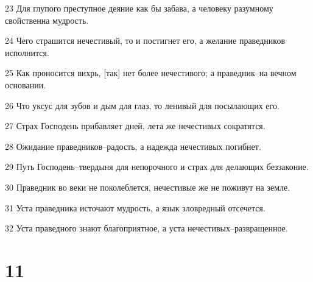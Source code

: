 \par 23 Для глупого преступное деяние как бы забава, а человеку разумному свойственна мудрость.
\par 24 Чего страшится нечестивый, то и постигнет его, а желание праведников исполнится.
\par 25 Как проносится вихрь, [так] нет более нечестивого; а праведник--на вечном основании.
\par 26 Что уксус для зубов и дым для глаз, то ленивый для посылающих его.
\par 27 Страх Господень прибавляет дней, лета же нечестивых сократятся.
\par 28 Ожидание праведников--радость, а надежда нечестивых погибнет.
\par 29 Путь Господень--твердыня для непорочного и страх для делающих беззаконие.
\par 30 Праведник во веки не поколеблется, нечестивые же не поживут на земле.
\par 31 Уста праведника источают мудрость, а язык зловредный отсечется.
\par 32 Уста праведного знают благоприятное, а уста нечестивых--развращенное.

\chapter{11}

